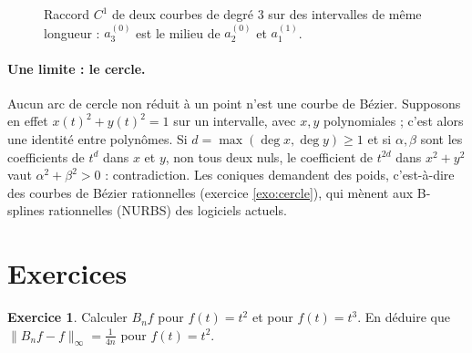 \documentclass[11pt,a4paper]{article}
\theoremstyle{plain}
\theoremstyle{definition}
\newtheorem{exercice}{Exercice}
\theoremstyle{remark}
\begin{document}
\begin{figure}[h]
\centering
{}
\caption{Raccord $C^1$ de deux courbes de degré $3$ sur des intervalles de même longueur : $a_3^{(0)}$ est le milieu de $a_2^{(0)}$ et $a_1^{(1)}$.}\label{fig:raccord}
\end{figure}

\paragraph{Une limite : le cercle.} Aucun arc de cercle non réduit à un point n'est une courbe de Bézier. Supposons en effet $x(t)^2+y(t)^2=1$ sur un intervalle, avec $x,y$ polynomiales ; c'est alors une identité entre polynômes. Si $d=\max(\deg x,\deg y)\geq1$ et si $\alpha,\beta$ sont les coefficients de $t^d$ dans $x$ et $y$, non tous deux nuls, le coefficient de $t^{2d}$ dans $x^2+y^2$ vaut $\alpha^2+\beta^2>0$ : contradiction. Les coniques demandent des poids, c'est-à-dire des courbes de Bézier rationnelles (exercice \ref{exo:cercle}), qui mènent aux B-splines rationnelles (NURBS) des logiciels actuels.

\section{Exercices}

\begin{exercice}\label{exo:carre}
Calculer $B_nf$ pour $f(t)=t^2$ et pour $f(t)=t^3$. En déduire que $\|B_nf-f\|_\infty=\frac1{4n}$ pour $f(t)=t^2$.
\end{exercice}
\end{document}
